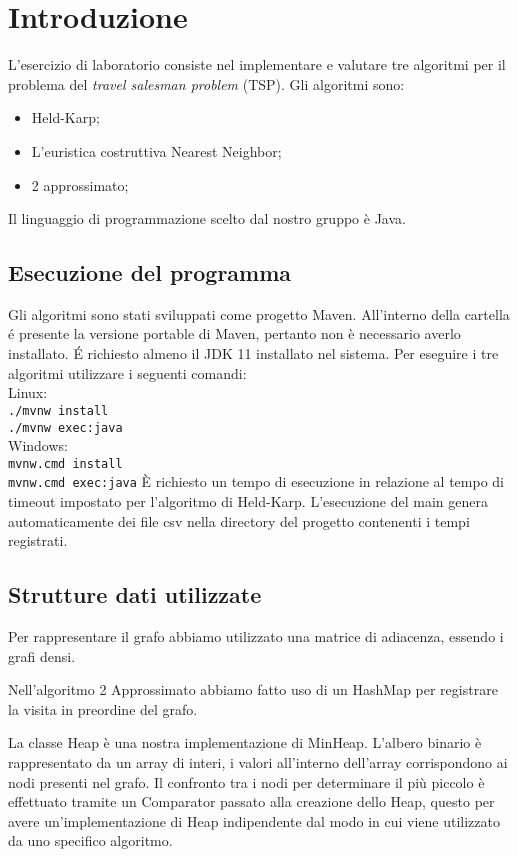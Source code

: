 \section{Introduzione}

L'esercizio di laboratorio consiste nel implementare e valutare tre algoritmi per il problema del \textit{travel salesman problem} (TSP). Gli algoritmi sono:
\begin{itemize}
	\item Held-Karp;
	\item L'euristica costruttiva Nearest Neighbor;
	\item 2 approssimato;
\end{itemize}
Il linguaggio di programmazione scelto dal nostro gruppo è Java.

\subsection{Esecuzione del programma}
Gli algoritmi sono stati sviluppati come progetto Maven. All'interno della cartella \'e presente la versione portable di Maven, pertanto non è necessario averlo installato. \'E
richiesto almeno il JDK 11 installato nel sistema.
Per eseguire i tre algoritmi utilizzare i seguenti comandi:\\
Linux:\\
\indent \texttt{./mvnw install}\\
\indent \texttt{./mvnw exec:java}\\
Windows:\\
\indent \texttt{mvnw.cmd install}\\
\indent \texttt{mvnw.cmd exec:java}
\uppercase{è} richiesto un tempo di esecuzione in relazione al tempo di timeout impostato per l'algoritmo di Held-Karp.
L'esecuzione del main genera automaticamente dei file csv nella directory del progetto contenenti i tempi registrati.
\subsection{Strutture dati utilizzate}

Per rappresentare il grafo abbiamo utilizzato una matrice di adiacenza, essendo i grafi densi.

Nell'algoritmo 2 Approssimato abbiamo fatto uso di un HashMap per registrare la visita in preordine del grafo.

La classe Heap è una nostra implementazione di MinHeap. L'albero binario è rappresentato da un array di interi, i valori all'interno dell'array corrispondono ai nodi presenti nel grafo. Il confronto tra i nodi per determinare il più piccolo è effettuato tramite un Comparator passato alla creazione dello Heap, questo per avere un'implementazione di Heap indipendente dal modo in cui viene utilizzato da uno specifico algoritmo.
